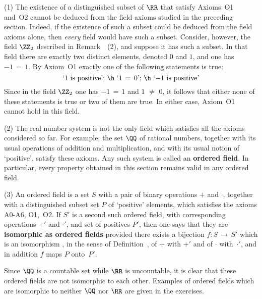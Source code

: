       \hspace*{\parindent} (1) The existence of a distinguished subset of ${\RR}$ that satisfy
    Axioms~O1 and~O2 cannot be deduced from the field axioms studied in the preceding section.
    Indeed, if the existence of such a subset could be deduced from the field axioms alone, then {\em every} field would have such a subset.
    Consider, however, the field ${\ZZ}_{2}$ described in Remark~~(2), and suppose it has such a subset.
    In that field there are exactly two distinct elements, denoted $0$ and $1$, and one has $-1 \,=\, 1$. By Axiom~O1 exactly one of the following statements is true:
        \begin{displaymath}
        \mbox{`$1$ is positive'; \h `$1 \,=\, 0$'; \h `$-1$ is positive'}
        \end{displaymath}
 Since in the field ${\ZZ}_{2}$ one has $-1 \,=\, 1$ and $1 \,\,{\neq}\,\, 0$,
    it follows that either none of these statements is true or two of them are true. In either case, Axiom~O1 cannot hold in this field.

\V

       (2) The real number system is not the only field which satisfies all the axioms considered so far.
    For example, the set ${\QQ}$ of rational numbers, together with its usual operations of addition and multiplication,
    and with its usual notion of `positive', satisfy these axioms. Any such system is called an {\bf ordered field}.
    In particular, every property obtained in this section remains valid in any ordered field.

\V

        (3) An ordered field is a set $S$ with a pair of binary operations $+$ and ${\cdot}$,
    together with a distinguished subset set $P$ of `positive' elements, which satisfies the axioms A0-A6, O1,~O2.
    If $S'$ is a second such ordered field, with corresponding operations $+'$ and ${\cdot}'$, and set of positives $P'$,
    then one says that they are {\bf isomorphic as ordered fields}
    provided there exists a bijection $f:S \,{\rightarrow}\, S'$ which is an isomorphism , in the sense of Definition~,
    of $+$ with $+'$ and of ${\cdot}$ with~${\cdot}'$, and in addition $f$ maps $P$ onto~$P'$.

        Since ${\QQ}$ is a countable set while ${\RR}$ is uncountable, it is clear that these ordered fields are not isomorphic to each other.
    Examples of ordered fields which are isomorphic to neither ${\QQ}$ nor ${\RR}$ are given in the exercises.

